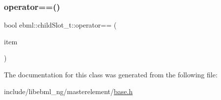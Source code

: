 \mbox{\label{classebml_1_1childSlot__t_aa6c541a6a2757beadce3ceeb1a4d2358}} 
\subsubsection{\texorpdfstring{operator==()}{operator==()}\hspace{0.1cm}{\footnotesize\ttfamily [3/3]}}
{\footnotesize\ttfamily bool ebml\+::child\+Slot\+\_\+t\+::operator== (\begin{DoxyParamCaption}\item[{const \mbox{\hyperlink{classebml_1_1childSlot__t}{child\+Slot\+\_\+t}} \&}]{item }\end{DoxyParamCaption})}



The documentation for this class was generated from the following file\+:\begin{DoxyCompactItemize}
\item 
include/libebml\+\_\+ng/masterelement/\mbox{\hyperlink{base_8h}{base.\+h}}\end{DoxyCompactItemize}
